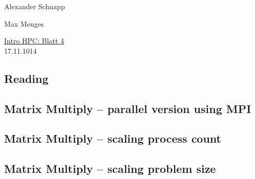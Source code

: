 \documentclass[a4paper,11pt]{scrartcl}
\begin{document}
\hfill Alexander Schnapp

\hfill Max Menges

\begin{center}
\underline{\Huge{Intro HPC: Blatt 4}}\\
\large{17.11.1014}\\
\end{center}

\subsection{Reading}

\subsection{Matrix Multiply -- parallel version using MPI}

\subsection{Matrix Multiply -- scaling process count}

\subsection{Matrix Multiply -- scaling problem size}
\end{document}
